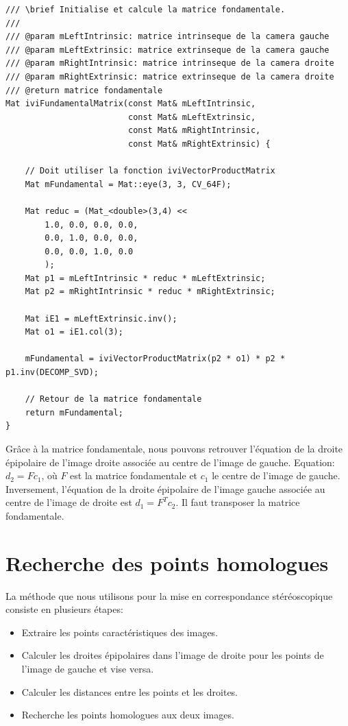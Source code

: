 \documentclass[a4paper,11pt]{article}
\begin{document}
\begin{lstlisting}[caption=Fonction qui calcule la matrice fondamentale]
/// \brief Initialise et calcule la matrice fondamentale.
///
/// @param mLeftIntrinsic: matrice intrinseque de la camera gauche
/// @param mLeftExtrinsic: matrice extrinseque de la camera gauche
/// @param mRightIntrinsic: matrice intrinseque de la camera droite
/// @param mRightExtrinsic: matrice extrinseque de la camera droite
/// @return matrice fondamentale
Mat iviFundamentalMatrix(const Mat& mLeftIntrinsic,
                         const Mat& mLeftExtrinsic,
                         const Mat& mRightIntrinsic,
                         const Mat& mRightExtrinsic) {

    // Doit utiliser la fonction iviVectorProductMatrix
    Mat mFundamental = Mat::eye(3, 3, CV_64F);

    Mat reduc = (Mat_<double>(3,4) <<
        1.0, 0.0, 0.0, 0.0,
        0.0, 1.0, 0.0, 0.0,
        0.0, 0.0, 1.0, 0.0
        );
    Mat p1 = mLeftIntrinsic * reduc * mLeftExtrinsic;
    Mat p2 = mRightIntrinsic * reduc * mRightExtrinsic;

    Mat iE1 = mLeftExtrinsic.inv();
    Mat o1 = iE1.col(3);

    mFundamental = iviVectorProductMatrix(p2 * o1) * p2 * p1.inv(DECOMP_SVD);

    // Retour de la matrice fondamentale
    return mFundamental;
}
\end{lstlisting}

Grâce à la matrice fondamentale, nous pouvons retrouver l'équation de la droite épipolaire 
de l'image droite associée au centre de l'image de gauche. Equation: $d_2=Fc_1$, où $F$ est 
la matrice fondamentale et $c_1$ le centre de l'image de gauche.\\

Inversement, l'équation de la droite épipolaire de l'image gauche associée au centre de l'image 
de droite est $d_1=F^Tc_2$. Il faut transposer la matrice fondamentale.\\



\section{Recherche des points homologues}

La méthode que nous utilisons pour la mise en correspondance stéréoscopique consiste en plusieurs
étapes:

\begin{itemize}
 \item Extraire les points caractéristiques des images.
 \item Calculer les droites épipolaires dans l'image de droite pour les points de l'image de 
 gauche et vise versa.
 \item Calculer les distances entre les points et les droites.
 \item Recherche les points homologues aux deux images.
\end{itemize}
\end{document}
